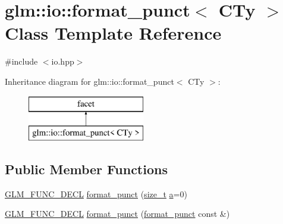 \hypertarget{classglm_1_1io_1_1format__punct}{}\section{glm\+:\+:io\+:\+:format\+\_\+punct$<$ C\+Ty $>$ Class Template Reference}
\label{classglm_1_1io_1_1format__punct}


{\ttfamily \#include $<$io.\+hpp$>$}

Inheritance diagram for glm\+:\+:io\+:\+:format\+\_\+punct$<$ C\+Ty $>$\+:\begin{figure}[H]
\begin{center}
\leavevmode
\includegraphics[height=2.000000cm]{classglm_1_1io_1_1format__punct}
\end{center}
\end{figure}
\subsection*{Public Member Functions}
\begin{DoxyCompactItemize}
\item 
\mbox{\hyperlink{setup_8hpp_ab2d052de21a70539923e9bcbf6e83a51}{G\+L\+M\+\_\+\+F\+U\+N\+C\+\_\+\+D\+E\+CL}} \mbox{\hyperlink{classglm_1_1io_1_1format__punct_ae56e7a14fac2516658837281b9da4659}{format\+\_\+punct}} (\mbox{\hyperlink{_s_d_l__config__winrt_8h_a7c94ea6f8948649f8d181ae55911eeaf}{size\+\_\+t}} \mbox{\hyperlink{_s_d_l__opengl__glext_8h_a3309789fc188587d666cda5ece79cf82}{a}}=0)
\item 
\mbox{\hyperlink{setup_8hpp_ab2d052de21a70539923e9bcbf6e83a51}{G\+L\+M\+\_\+\+F\+U\+N\+C\+\_\+\+D\+E\+CL}} \mbox{\hyperlink{classglm_1_1io_1_1format__punct_a89a8c3cfb0b975f3dd8c0416101c59b7}{format\+\_\+punct}} (\mbox{\hyperlink{classglm_1_1io_1_1format__punct}{format\+\_\+punct}} const \&)
\end{DoxyCompactItemize}
